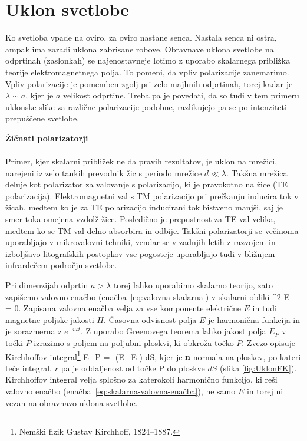 \section{Uklon svetlobe}

Ko svetloba vpade na oviro, za oviro nastane senca. Nastala senca ni ostra, ampak
ima zaradi uklona zabrisane robove. Obravnave 
uklona svetlobe na odprtinah (zaslonkah) se najenostavneje lotimo z uporabo
skalarnega približka teorije elektromagnetnega polja. To pomeni, da vpliv 
polarizacije zanemarimo. Vpliv polarizacije je pomemben zgolj pri zelo majhnih odprtinah, 
torej kadar je $\lambda\sim a$, kjer je $a$ velikost
odprtine. Treba pa je povedati, da so tudi v tem primeru uklonske slike za 
različne polarizacije podobne, razlikujejo pa se po intenziteti prepuščene svetlobe.

\begin{remark}{{\bf Žičnati polarizatorji}}\\ \\
Primer, kjer skalarni približek ne da pravih rezultatov, je uklon na mrežici, narejeni 
iz zelo tankih prevodnik žic s periodo mrežice $d\ll \lambda$. Takšna mrežica 
deluje kot polarizator za valovanje s polarizacijo, ki je pravokotno na žice (TE polarizacija). 
Elektromagnetni val s TM polarizacijo pri prečkanju inducira tok v žicah, medtem
ko je za TE polarizacijo inducirani tok bistveno manjši, saj je smer toka omejena
vzdolž žice. Posledično je prepustnost za TE val velika, medtem ko se TM val delno
absorbira in odbije. Takšni polarizatorji se večinoma uporabljajo v mikrovalovni tehniki, 
vendar se v zadnjih letih z razvojem in izboljšavo litografskih postopkov
vse pogosteje uporabljajo tudi v bližnjem infrardečem področju svetlobe.
\end{remark}

Pri dimenzijah odprtin $a>\lambda$ torej lahko uporabimo skalarno teorijo, zato zapišemo
valovno enačbo (enačba~\ref{eq:valovna-skalarna}) v skalarni obliki
\beq
\nabla^2 E -  = 0.
\label{eq:skalarna-valovna-enačba}
\eeq
Zapisana valovna enačba velja za vse komponente električne $E$ in tudi 
magnetne poljske jakosti $H$. Časovna odvisnost polja $E$ je harmonična funkcija in 
je sorazmerna z $e^{-i \omega t}$. Z uporabo Greenovega teorema lahko 
jakost polja $E_P$ v točki $P$ izrazimo s poljem na poljubni ploskvi, ki obkroža točko $P$. 
Zvezo opisuje Kirchhoffov integral\footnote{Nemški fizik Gustav Kirchhoff, 1824--1887.} 
\beq
E_P = -\oint \left(E\,\cdot \nabla {}-
\cdot \nabla E \right) dS,
\label{eq:Kirchhoffov-integral}
\eeq
kjer je $\mathbf{n}$ normala na ploskev, po kateri teče integral, $r$ pa je oddaljenost od točke P
do ploskve $dS$ (slika \ref{fig:UklonFK}). Kirchhoffov integral velja splošno za katerokoli harmonično 
funkcijo, ki reši valovno enačbo (enačba~\ref{eq:skalarna-valovna-enačba}), ne samo $E$ in torej
ni vezan na obravnavo uklona svetlobe. 

